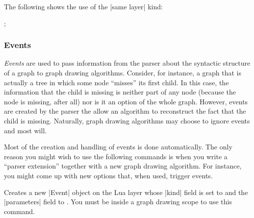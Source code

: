   The following shows the use of the |same layer| kind:
  \begin{codeexample}[]
 ;
\end{codeexample}



\subsubsection{Events}
\label{section-gd-events}

\emph{Events} are used to pass information from the parser about the
syntactic structure of a graph to graph drawing algorithms. Consider,
for instance, a graph that is actually a tree in which some node
``misses'' its first child. In this case, the information that the
child is missing is neither part of any node (because the node is
missing, after all) nor is it an option of the whole graph. However,
events are created by the parser the allow an algorithm to reconstruct
the fact that the child is missing. Naturally, graph drawing
algorithms may choose to ignore events and most will.

Most of the creation and handling of events is done automatically. The
only reason you might wish to use the following commands is when you
write a ``parser extension'' together with a new graph drawing
algorithm. For instance, you might come up with new options that, when
used, trigger events.

\begin{command}{\pgfgdevent{}}
  Creates a new |Event| object on the Lua layer whose |kind| field is
  set to  and the |parameters| field to .
  You must be inside a graph drawing scope to use this command.
\end{command}


